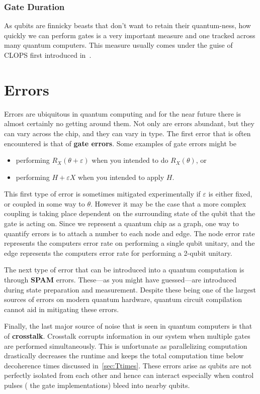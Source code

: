 \subsubsection{Gate Duration}

As qubits are finnicky beasts that don't want to retain their quantum-ness, how quickly we can perform gates is a very important measure and one tracked across many quantum computers.
This measure usually comes under the guise of \ac{CLOPS} first introduced in~\cite{clops}. %

\section{Errors}\label{sec:errors}

Errors are ubiquitous in quantum computing and for the near future there is almost certainly no getting around them.
Not only are errors abundant, but they can vary across the chip, and they can vary in type.
The first error that is often encountered is that of \textbf{gate errors}.
Some examples of gate errors might be
\begin{itemize}
    \item performing $R_X(\theta + \varepsilon)$ when you intended to do $R_X(\theta)$, or
    \item performing $H + \varepsilon X$ when you intended to apply $H$.
\end{itemize}
This first type of error is sometimes mitigated experimentally if $\varepsilon$ is either fixed, or coupled in some way to $\theta$.
However it may be the case that a more complex coupling is taking place dependent on the surrounding state of the qubit that the gate is acting on.
Since we represent a quantum chip as a graph, one way to quantify errors is to attach a number to each node and edge.
The node error rate represents the computers error rate on performing a single qubit unitary, and the edge represents the computers error rate for performing a 2-qubit unitary.

The next type of error that can be introduced into a quantum computation is through \textbf{\ac{SPAM}} errors. %
These---as you might have guessed---are introduced during state preparation and measurement.
Despite these being one of the largest sources of errors on modern quantum hardware, quantum circuit compilation cannot aid in mitigating these errors.

Finally, the last major source of noise that is seen in quantum computers is that of \textbf{crosstalk}.
Crosstalk corrupts information in our system when multiple gates are performed simultaneously.
This is unfortunate as parallelizing computation drastically decreases the runtime and keeps the total computation time below decoherence times discussed in~\cref{sec:Ttimes}.
These errors arise as qubits are not perfectly isolated from each other and hence can interact especially when control pulses (\ie{} the gate implementations) bleed into nearby qubits.

